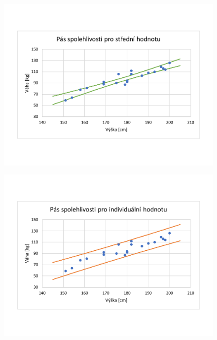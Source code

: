 \documentclass[11pt, a4paper, titlepage]{article}
\begin{document}
\begin{figure}[H]
    \centering
    \includegraphics[width=.9\linewidth]{images/2-c-3-crop.pdf}
\end{figure}
\bigskip

\begin{figure}[H]
    \centering
    \includegraphics[width=.9\linewidth]{images/2-c-4-crop.pdf}
\end{figure}

\end{document}

